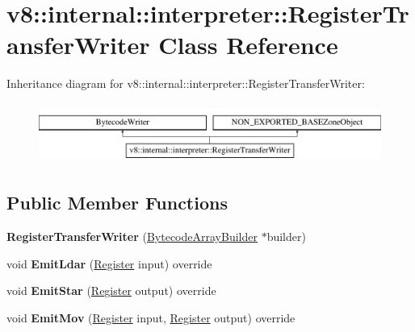 \hypertarget{classv8_1_1internal_1_1interpreter_1_1RegisterTransferWriter}{}\section{v8\+:\+:internal\+:\+:interpreter\+:\+:Register\+Transfer\+Writer Class Reference}
\label{classv8_1_1internal_1_1interpreter_1_1RegisterTransferWriter}
Inheritance diagram for v8\+:\+:internal\+:\+:interpreter\+:\+:Register\+Transfer\+Writer\+:\begin{figure}[H]
\begin{center}
\leavevmode
\includegraphics[height=1.992882cm]{classv8_1_1internal_1_1interpreter_1_1RegisterTransferWriter}
\end{center}
\end{figure}
\subsection*{Public Member Functions}
\begin{DoxyCompactItemize}
\item 
\mbox{\label{classv8_1_1internal_1_1interpreter_1_1RegisterTransferWriter_ae7f83b8e16a5549f8893c49e0d30b307}} 
{\bfseries Register\+Transfer\+Writer} (\mbox{\hyperlink{classv8_1_1internal_1_1interpreter_1_1BytecodeArrayBuilder}{Bytecode\+Array\+Builder}} $\ast$builder)
\item 
\mbox{\label{classv8_1_1internal_1_1interpreter_1_1RegisterTransferWriter_aebbe23bf2b47e793f6079148c8babb65}} 
void {\bfseries Emit\+Ldar} (\mbox{\hyperlink{classv8_1_1internal_1_1interpreter_1_1Register}{Register}} input) override
\item 
\mbox{\label{classv8_1_1internal_1_1interpreter_1_1RegisterTransferWriter_ab8ed154eee40e41e79c56b13c1568a99}} 
void {\bfseries Emit\+Star} (\mbox{\hyperlink{classv8_1_1internal_1_1interpreter_1_1Register}{Register}} output) override
\item 
\mbox{\label{classv8_1_1internal_1_1interpreter_1_1RegisterTransferWriter_adcf84aae8c737eb960ab2c9babd7e459}} 
void {\bfseries Emit\+Mov} (\mbox{\hyperlink{classv8_1_1internal_1_1interpreter_1_1Register}{Register}} input, \mbox{\hyperlink{classv8_1_1internal_1_1interpreter_1_1Register}{Register}} output) override
\end{DoxyCompactItemize}


